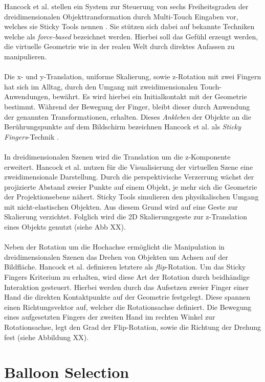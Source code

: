 Hancock et al. stellen ein System zur Steuerung von sechs Freiheitsgraden der dreidimensionalen Objekttransformation durch Multi-Touch Eingaben vor, welches sie Sticky Tools nennen \cite{hancock:2009}. Sie stützen sich dabei auf bekannte Techniken welche als \emph{force-based} bezeichnet werden. Hierbei soll das Gefühl erzeugt werden, die virtuelle Geometrie wie in der realen Welt durch direktes Anfassen zu manipulieren. 
\\\\
Die x- und y-Translation, uniforme Skalierung, sowie z-Rotation mit zwei Fingern hat sich im Alltag, durch den Umgang mit zweidimensionalen Touch-Anwendungen, bewährt. Es wird hierbei ein Initialkontakt mit der Geometrie bestimmt. Während der Bewegung der Finger, bleibt dieser durch Anwendung der genannten Transformationen, erhalten. Dieses \emph{Ankleben} der Objekte an die Berührungspunkte auf dem Bildschirm bezeichnen Hancock et al. als \emph{Sticky Fingers}-Technik \cite{hancock:2007,hancock:2009}.
\\\\
In dreidimensionalen Szenen wird die Translation um die z-Komponente erweitert. Hancock et al. nutzen für die Visualisierung der virtuellen Szene eine zweidimensionale Darstellung. Durch die perspektivische Verzerrung wächst der projizierte Abstand zweier Punkte auf einem Objekt, je mehr sich die Geometrie der Projektionsebene nähert. Sticky Tools simulieren den physikalischen Umgang mit nicht-elastischen Objekten. Aus diesem Grund wird auf eine Geste zur Skalierung verzichtet. Folglich wird die 2D Skalierungsgeste zur z-Translation eines Objekts genutzt (siehe Abb XX).
\\\\
Neben der Rotation um die Hochachse ermöglicht die Manipulation in dreidimensionalen Szenen das Drehen von Objekten um Achsen auf der Bildfläche. Hancock et al. definieren letztere als \emph{flip}-Rotation. Um das Sticky Fingers Kriterium zu erhalten, wird diese Art der Rotation durch beidhändige Interaktion gesteuert. Hierbei werden durch das Aufsetzen zweier Finger einer Hand die direkten Kontaktpunkte auf der Geometrie festgelegt. Diese spannen einen Richtungsvektor auf, welcher die Rotationsachse definiert. Die Bewegung eines aufgesetzten Fingers der zweiten Hand im rechten Winkel zur Rotationsachse, legt den Grad der Flip-Rotation, sowie die Richtung der Drehung fest (siehe Abbildung XX).


\section{Balloon Selection}
\label{sec:related_balloon_selection}

